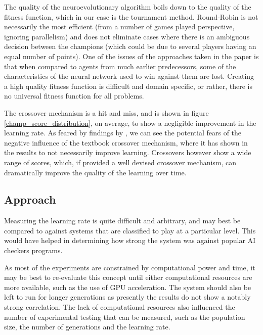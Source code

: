 \documentclass[12pt,a4paper]{article}
\begin{document}
    The quality of the neuroevolutionary algorithm boils down to the quality of the fitness function, which in our case is the tournament method. Round-Robin is not necessarily the most efficient (from a number of games played perspective, ignoring  parallelism) and does not eliminate cases where there is an ambiguous decision between the champions (which could be due to several players having an equal number of points). One of the issues of the approaches taken in the paper is that when compared to agents from much earlier predecessors, some of the characteristics of the neural network used to win against them are lost. Creating a high quality fitness function is difficult and domain specific, or rather, there is no universal fitness function for all problems.
   
    The crossover mechanism is a hit and miss, and is shown in figure \ref{champ_score_distribution}, on average, to show a negligible improvement in the learning rate. As feared by findings by \cite{emmanouilidis_comparison_2000}, we can see the potential fears of the negative influence of the textbook crossover mechanism, where it has shown in the results to not necessarily improve learning. Crossovers however show a wide range of scores, which, if provided a well devised crossover mechanism, can dramatically improve the quality of the learning over time.

    \subsection{Approach}
        Measuring the learning rate is quite difficult and arbitrary, and may best be compared to against systems that are classified to play at a particular level. This would have helped in determining how strong the system was against popular AI checkers programs. 

        As most of the experiments are constrained by computational power and time, it may be best to re-evaluate this concept until either computational resources are more available, such as the use of GPU acceleration. The system should also be left to run for longer generations as presently the results do not show a notably strong correlation. The lack of computational resources also influenced the number of experimental testing that can be measured, such as the population size, the number of generations and the learning rate. 
        
\end{document}
